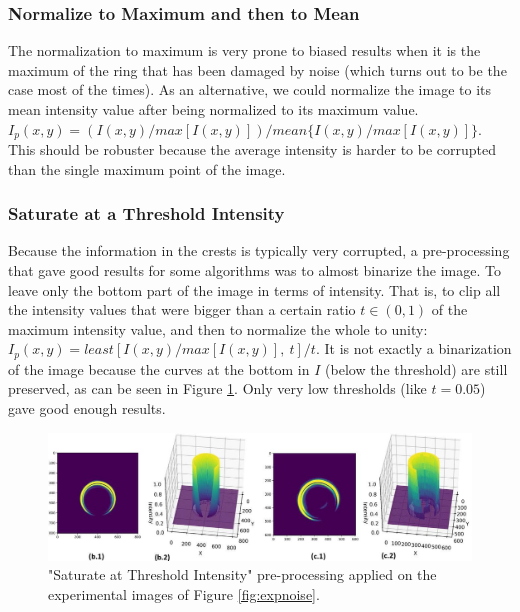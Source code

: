 \documentclass[11pt, a4paper, twoside]{article} %
\begin{document}
\subsubsection*{Normalize to Maximum and then to Mean}\vspace{-0.3cm}
The normalization to maximum is very prone to biased results when it is the maximum of the ring that has been damaged by noise (which turns out to be the case most of the times). As an alternative, we could normalize the image to its mean intensity value after being normalized to its maximum value. $I_p(x,y) = (I(x,y)/max[I(x,y)])/mean\{I(x,y)/max[I(x,y)]\}$. This should be robuster because the average intensity is harder to be corrupted than the single maximum point of the image. 

\subsubsection*{Saturate at a Threshold Intensity}\vspace{-0.3cm}
Because the information in the crests is typically very corrupted, a pre-processing that gave good results for some algorithms was to almost binarize the image. To leave only the bottom part of the image in terms of intensity. That is, to clip all the intensity values that were bigger than a certain ratio $t\in(0,1)$ of the maximum intensity value, and then to normalize the whole to unity: $I_p(x,y)=least[I(x,y)/max[I(x,y)],\ t]/t$. It is not exactly a binarization of the image because the curves at the bottom in $I$ (below the threshold) are still preserved, as can be seen in Figure \ref{fig:preprocessingThresh}. Only very low thresholds (like $t=0.05$) gave good enough results.
\begin{figure}[h!] 
     \centering 
    \includegraphics[width=0.9\linewidth]{thresh.jpg}
    \caption{"Saturate at Threshold Intensity" pre-processing applied on the experimental images of Figure \ref{fig:expnoise}.}
    \label{fig:preprocessingThresh} \vspace{-0.65cm}
\end{figure}
\end{document}
